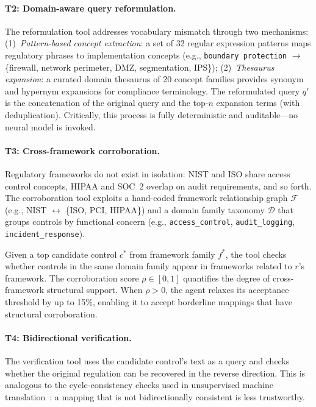 \documentclass[a4paper,fleqn]{cas-sc}
\begin{document}
\paragraph{T2: Domain-aware query reformulation.}
The reformulation tool addresses vocabulary mismatch through two mechanisms:
(1)~\emph{Pattern-based concept extraction}: a set of 32 regular expression patterns maps regulatory phrases to implementation concepts (e.g., \texttt{boundary protection} $\rightarrow$ \{firewall, network perimeter, DMZ, segmentation, IPS\});
(2)~\emph{Thesaurus expansion}: a curated domain thesaurus of 20 concept families provides synonym and hypernym expansions for compliance terminology.
The reformulated query $q'$ is the concatenation of the original query and the top-$n$ expansion terms (with deduplication).
Critically, this process is fully deterministic and auditable---no neural model is invoked.

\paragraph{T3: Cross-framework corroboration.}
Regulatory frameworks do not exist in isolation: NIST and ISO share access control concepts, HIPAA and SOC~2 overlap on audit requirements, and so forth.
The corroboration tool exploits a hand-coded framework relationship graph $\mathcal{F}$ (e.g., NIST $\leftrightarrow$ \{ISO, PCI, HIPAA\}) and a domain family taxonomy $\mathcal{D}$ that groups controls by functional concern (e.g., \texttt{access\_control}, \texttt{audit\_logging}, \texttt{incident\_response}).

Given a top candidate control $c^*$ from framework family $f^*$, the tool checks whether controls in the same domain family appear in frameworks related to $r$'s framework.
The corroboration score $\rho \in [0, 1]$ quantifies the degree of cross-framework structural support.
When $\rho > 0$, the agent relaxes its acceptance threshold by up to 15\%, enabling it to accept borderline mappings that have structural corroboration.

\paragraph{T4: Bidirectional verification.}
The verification tool uses the candidate control's text as a query and checks whether the original regulation can be recovered in the reverse direction.
This is analogous to the cycle-consistency checks used in unsupervised machine translation~\citep{Lample2018}: a mapping that is not bidirectionally consistent is less trustworthy.
\end{document}

